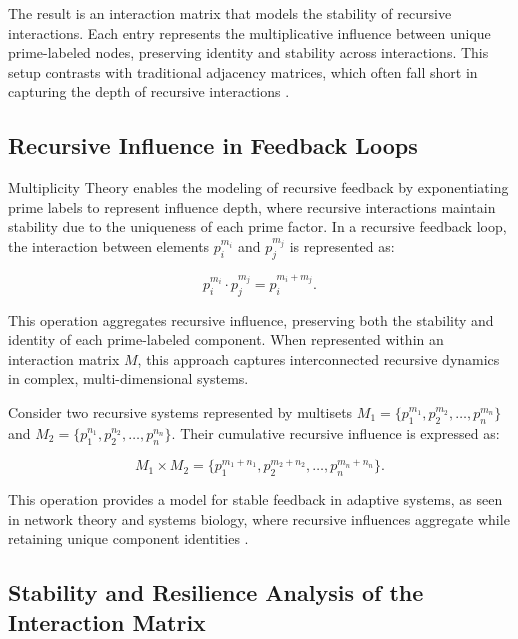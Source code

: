 \documentclass{article}
\begin{document}
The result is an interaction matrix that models the stability of recursive interactions. Each entry represents the multiplicative influence between unique prime-labeled nodes, preserving identity and stability across interactions. This setup contrasts with traditional adjacency matrices, which often fall short in capturing the depth of recursive interactions \citep{blizard1989, kumar1990}.

\subsection{Recursive Influence in Feedback Loops}

Multiplicity Theory enables the modeling of recursive feedback by exponentiating prime labels to represent influence depth, where recursive interactions maintain stability due to the uniqueness of each prime factor. In a recursive feedback loop, the interaction between elements \( p_i^{m_i} \) and \( p_j^{m_j} \) is represented as:

\begin{equation}
p_i^{m_i} \cdot p_j^{m_j} = p_i^{m_i + m_j}.
\end{equation}

This operation aggregates recursive influence, preserving both the stability and identity of each prime-labeled component. When represented within an interaction matrix \( M \), this approach captures interconnected recursive dynamics in complex, multi-dimensional systems.

Consider two recursive systems represented by multisets \( M_1 = \{p_1^{m_1}, p_2^{m_2}, \ldots, p_n^{m_n}\} \) and \( M_2 = \{p_1^{n_1}, p_2^{n_2}, \ldots, p_n^{n_n}\} \). Their cumulative recursive influence is expressed as:

\begin{equation}
M_1 \times M_2 = \{p_1^{m_1 + n_1}, p_2^{m_2 + n_2}, \ldots, p_n^{m_n + n_n}\}.
\end{equation}

This operation provides a model for stable feedback in adaptive systems, as seen in network theory and systems biology, where recursive influences aggregate while retaining unique component identities \citep{newman2018}.

\subsection{Stability and Resilience Analysis of the Interaction Matrix}
\end{document}
